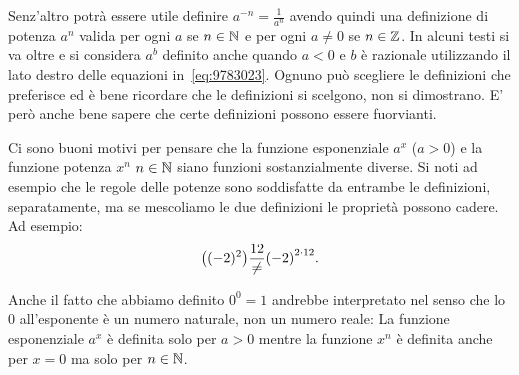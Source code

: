 Senz'altro potrà essere utile definire 
$a^{-n} = \frac 1 {a^n}$ avendo quindi una definizione 
di potenza $a^n$ valida per ogni $a$ se $n\in {\mathbb N}$ 
e per ogni $a\neq 0$ se $n\in {\mathbb Z}$.
In alcuni testi si va oltre e si considera $a^b$ 
definito anche quando $a<0$ e $b$ è razionale
utilizzando il lato destro delle equazioni 
in~\eqref{eq:9783023}.
Ognuno può scegliere le definizioni che preferisce 
ed è bene ricordare che le definizioni si scelgono, 
non si dimostrano. 
E' però anche bene sapere che certe definizioni 
possono essere fuorvianti.

Ci sono buoni motivi per pensare che la funzione 
esponenziale $a^x$ ($a>0$) e la funzione potenza $x^n$ 
$n\in {\mathbb N}$ siano funzioni sostanzialmente diverse.
Si noti ad esempio che le regole delle potenze sono 
soddisfatte da entrambe le definizioni, separatamente, 
ma se mescoliamo le due definizioni le proprietà 
possono cadere. Ad esempio:
\[
  {\left( (-2)^2 \right)}\frac {1 2} 
  \neq {\left( -2 \right)}^{2\cdot 1 2}.
\]

Anche il fatto che abbiamo definito $0^0=1$ andrebbe 
interpretato nel senso che lo $0$ all'esponente 
è un numero naturale, non un numero reale:
La funzione esponenziale $a^x$ è definita 
solo per $a>0$ mentre la funzione $x^n$ è definita anche 
per $x=0$ ma solo per $n\in {\mathbb N}$.




